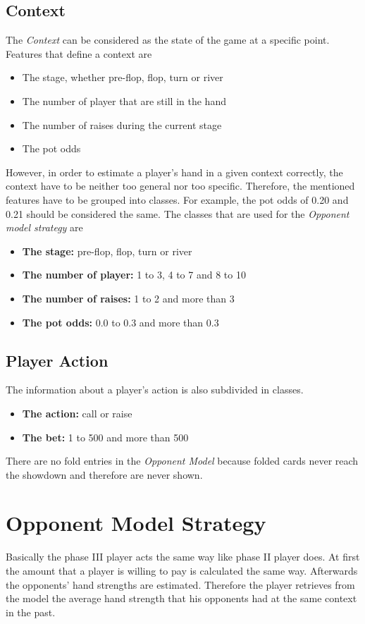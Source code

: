 \subsection{Context}
The \emph{Context} can be considered as the state of the game at a specific point. Features that define a context are 
\begin{itemize}
	\item The stage, whether pre-flop, flop, turn or river
	\item The number of player that are still in the hand
	\item The number of raises during the current stage
	\item The pot odds
\end{itemize}

However, in order to estimate a player's hand in a given context correctly, the context have to be neither too general nor too specific. Therefore, the mentioned features have to be grouped into classes. For example, the pot odds of 0.20 and 0.21 should be considered the same. The classes that are used for the \emph{Opponent model strategy} are 
\begin{itemize}
	\item \textbf{The stage:} pre-flop, flop, turn or river
	\item \textbf{The number of player:} 1 to 3, 4 to 7 and 8 to 10
	\item \textbf{The number of raises:} 1 to 2 and more than 3
	\item \textbf{The pot odds:} 0.0 to 0.3 and more than 0.3
\end{itemize}

\subsection{Player Action}
The information about a player's action is also subdivided in classes.
\begin{itemize}
	\item \textbf{The action:}  call or raise
	\item \textbf{The bet:} 1 to 500 and more than 500
\end{itemize}
There are no fold entries in the \emph{Opponent Model} because folded cards never reach the showdown and therefore are never shown. 

\section{Opponent Model Strategy}
Basically the phase III player acts the same way like phase II player does. At first the amount that a player is willing to pay is calculated the same way. Afterwards the opponents' hand strengths are estimated. Therefore the player retrieves from the model the average hand strength that his opponents had at the same context in the past.

